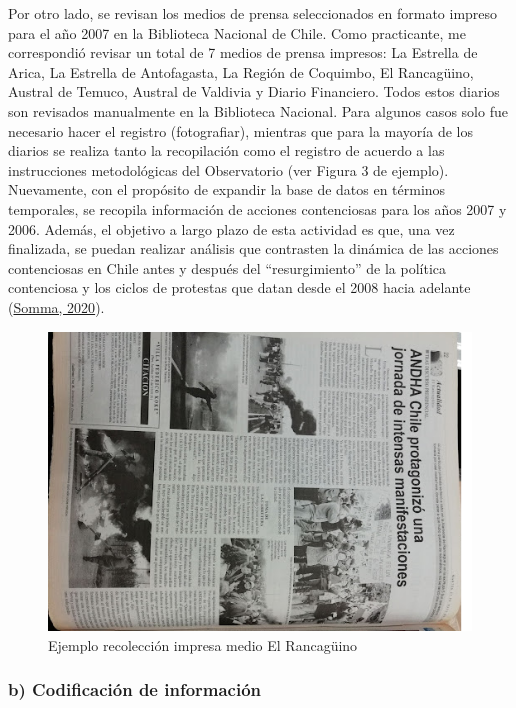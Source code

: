 \documentclass[
  12pt,
]{article}
\begin{document}
Por otro lado, se revisan los medios de prensa seleccionados en formato
impreso para el año 2007 en la Biblioteca Nacional de Chile. Como
practicante, me correspondió revisar un total de 7 medios de prensa
impresos: La Estrella de Arica, La Estrella de Antofagasta, La Región de
Coquimbo, El Rancagüino, Austral de Temuco, Austral de Valdivia y Diario
Financiero. Todos estos diarios son revisados manualmente en la
Biblioteca Nacional. Para algunos casos solo fue necesario hacer el
registro (fotografiar), mientras que para la mayoría de los diarios se
realiza tanto la recopilación como el registro de acuerdo a las
instrucciones metodológicas del Observatorio (ver Figura 3 de ejemplo).
Nuevamente, con el propósito de expandir la base de datos en términos
temporales, se recopila información de acciones contenciosas para los
años 2007 y 2006. Además, el objetivo a largo plazo de esta actividad es
que, una vez finalizada, se puedan realizar análisis que contrasten la
dinámica de las acciones contenciosas en Chile antes y después del
``resurgimiento'' de la política contenciosa y los ciclos de protestas
que datan desde el 2008 hacia adelante
(\protect\hyperlink{ref-sommaSocialMovementsLatin2020}{Somma, 2020}).

\begin{figure}[!ht]

{\centering \includegraphics[width=0.8\linewidth,]{biblio} 

}

\caption{Ejemplo recolección impresa medio El Rancagüino}\label{fig:fig3}
\end{figure}

\hypertarget{b-codificaciuxf3n-de-informaciuxf3n}{%
\subsubsection{b) Codificación de
información}\label{b-codificaciuxf3n-de-informaciuxf3n}}
\end{document}
